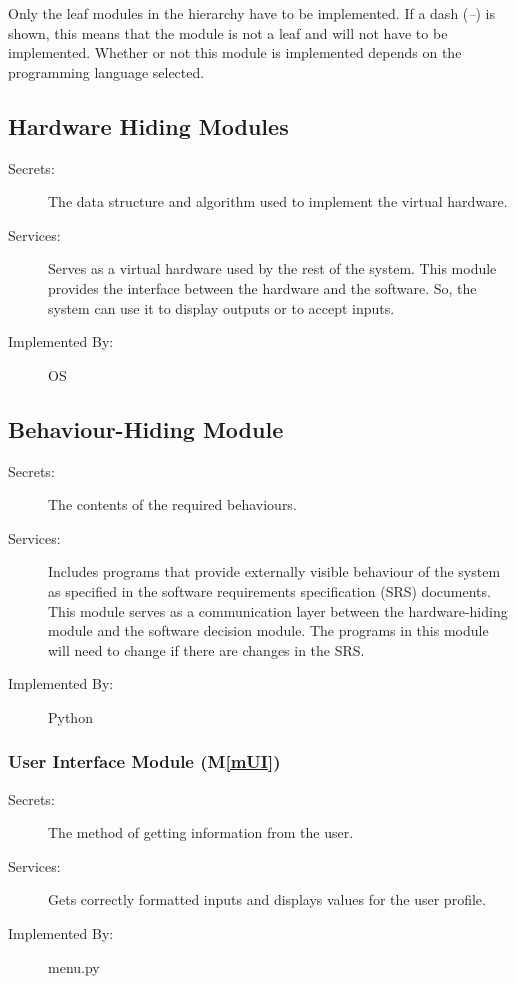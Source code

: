 \documentclass[12pt, titlepage]{article}
\newcommand{\mref}[1]{M\ref{#1}}
\begin{document}
Only the leaf modules in the
hierarchy have to be implemented. If a dash (\emph{--}) is shown, this means
that the module is not a leaf and will not have to be implemented. Whether or
not this module is implemented depends on the programming language
selected.

\subsection{Hardware Hiding Modules}

\begin{description}
\item[Secrets:]The data structure and algorithm used to implement the virtual
  hardware.
\item[Services:]Serves as a virtual hardware used by the rest of the
  system. This module provides the interface between the hardware and the
  software. So, the system can use it to display outputs or to accept inputs.
\item[Implemented By:] OS
\end{description}

\subsection{Behaviour-Hiding Module} 

\begin{description}
\item[Secrets:]The contents of the required behaviours.
\item[Services:]Includes programs that provide externally visible behaviour of
  the system as specified in the software requirements specification (SRS)
  documents. This module serves as a communication layer between the
  hardware-hiding module and the software decision module. The programs in this
  module will need to change if there are changes in the SRS.
\item[Implemented By:] Python
\end{description}

\subsubsection{User Interface Module (\mref{mUI})}

\begin{description}
\item[Secrets:] 
The method of getting information from the user.
\item[Services:] 
Gets correctly formatted inputs and displays values for the user profile.
\item[Implemented By:] menu.py
\end{description}
\end{document}

